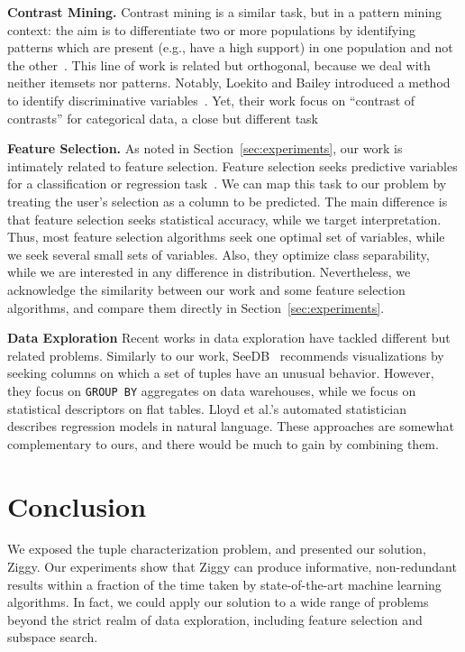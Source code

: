 \textbf{Contrast Mining.} Contrast mining is a similar task, but in a pattern
mining context: the aim is to differentiate two or more populations by
identifying patterns which are present (e.g., have a high support) in one
population and not the
other~\cite{vreeken2007characterising,webb2008detecting}. This line of work is
related but orthogonal, because we deal with neither itemsets nor patterns.
Notably, Loekito and Bailey introduced a  method to identify discriminative 
variables~\cite{loekito2008mining}.  Yet, their work focus on ``contrast of
contrasts'' for categorical data, a close but different task

\textbf{Feature Selection.} As noted in Section~\ref{sec:experiments}, our work
is intimately related to feature selection. Feature selection seeks predictive
variables for a classification or regression task~\cite{guyon2003introduction}.
We can map this task to our problem by treating the user's selection as a
column to be predicted. The main difference is that feature selection seeks
statistical accuracy, while we target interpretation. Thus, most feature
selection algorithms seek one optimal set of variables, while we seek several
small sets of variables. Also, they optimize class separability,
while we are interested in any difference in distribution. Nevertheless, we
acknowledge the similarity between our work and some feature selection
algorithms, and compare them directly in Section~\ref{sec:experiments}.

\textbf{Data Exploration} Recent works in data exploration have tackled
different but related problems. Similarly to our work,
SeeDB~\cite{vartak2015see} re\-com\-mends visualizations by seeking co\-lumns on
which a set of tuples have an unusual behavior. However, they focus on
\texttt{GROUP BY} aggregates on data warehouses, while we focus on
statistical descriptors on flat tables. Lloyd et al.'s automated
statistician~\cite{Lloyd2014ABCD} describes regression models in natural
language. These approaches are somewhat complementary to ours, and there would
be much to gain by combining them.


\section{Conclusion}
\label{sec:conclusions}
We exposed the tuple characterization problem, and presented our solution,
Ziggy. Our experiments show that Ziggy can produce informative, non-redundant
results within a fraction of the time taken by state-of-the-art machine
learning algorithms. In fact,  we could apply our solution to a wide range of
problems beyond the strict realm of data exploration, including feature
selection and subspace search.

